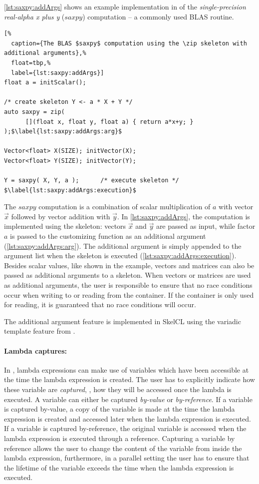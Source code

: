 \autoref{lst:saxpy:addArgs} shows an example implementation in \SkelCL of the \emph{single-precision real-alpha x plus y} ($saxpy$) computation -- a commonly used BLAS routine.
\begin{lstlisting}[%
  caption={The BLAS $saxpy$ computation using the \zip skeleton with additional arguments},%
  float=tbp,%
  label={lst:saxpy:addArgs}]
float a = initScalar();

/* create skeleton Y <- a * X + Y */
auto saxpy = zip(
      [](float x, float y, float a) { return a*x+y; } );$\label{lst:saxpy:addArgs:arg}$

Vector<float> X(SIZE); initVector(X);
Vector<float> Y(SIZE); initVector(Y);

Y = saxpy( X, Y, a );      /* execute skeleton */ $\label{lst:saxpy:addArgs:execution}$
\end{lstlisting}
The $saxpy$ computation is a combination of scalar multiplication of $a$ with vector $\vec{x}$ followed by vector addition with $\vec{y}$.
In \autoref{lst:saxpy:addArgs}, the computation is implemented using the \zip skeleton:
vectors $\vec{x}$ and $\vec{y}$ are passed as input, while factor $a$ is passed to the customizing function as an additional argument (\autoref{lst:saxpy:addArgs:arg}).
The additional argument is simply appended to the argument list when the skeleton is executed (\autoref{lst:saxpy:addArgs:execution}).
Besides scalar values, like shown in the example, vectors and matrices can also be passed as additional arguments to a skeleton.
When vectors or matrices are used as additional arguments, the user is responsible to ensure that no race conditions occur when writing to or reading from the container.
If the container is only used for reading, it is guaranteed that no race conditions will occur.

The additional argument feature is implemented in SkelCL using the variadic template feature from \Cpp.

\paragraph{Lambda captures:}
In \Cpp, lambda expressions can make use of variables which have been accessible at the time the lambda expression is created.
The user has to explicitly indicate how these variable are \emph{captured}, \ie, how they will be accessed once the lambda is executed.
A variable can either be captured \emph{by-value} or \emph{by-reference}.
If a variable is captured by-value, a copy of the variable is made at the time the lambda expression is created and accessed later when the lambda expression is executed.
If a variable is captured by-reference, the original variable is accessed when the lambda expression is executed through a reference.
Capturing a variable by reference allows the user to change the content of the variable from inside the lambda expression, furthermore, in a parallel setting the user has to ensure that the lifetime of the variable exceeds the time when the lambda expression is executed.

